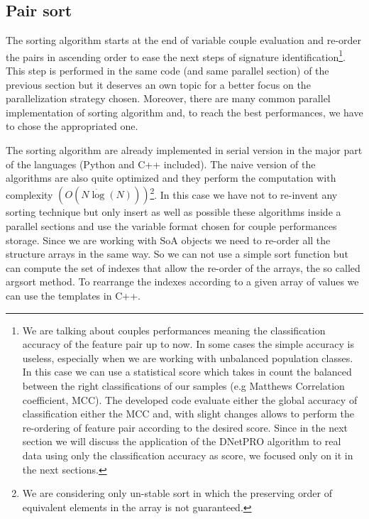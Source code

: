 \documentclass{standalone}
\begin{document}
\subsection[Sorting]{Pair sort}\label{implementation:sort}

The sorting algorithm starts at the end of variable couple evaluation and re-order the pairs in ascending order to ease the next steps of signature identification\footnote{
  We are talking about couples performances meaning the classification accuracy of the feature pair up to now.
  In some cases the simple accuracy is useless, especially when we are working with unbalanced population classes.
  In this case we can use a statistical score which takes in count the balanced between the right classifications of our samples (e.g Matthews Correlation coefficient, MCC).
  The developed code evaluate either the global accuracy of classification either the MCC and, with slight changes allows to perform the re-ordering of feature pair according to the desired score.
  Since in the next section we will discuss the application of the \textsf{DNetPRO} algorithm to real data using only the classification accuracy as score, we focused only on it in the next sections.
}.
This step is performed in the same code (and same parallel section) of the previous section but it deserves an own topic for a better focus on the parallelization strategy chosen.
Moreover, there are many common parallel implementation of sorting algorithm and, to reach the best performances, we have to chose the appropriated one.

The sorting algorithm are already implemented in serial version in the major part of the languages (\textsf{Python} and \textsf{C++} included).
The naive version of the algorithms are also quite optimized and they perform the computation with complexity $(O(N\dot\log(N)))$\footnote{
  We are considering only un-stable sort in which the preserving order of equivalent elements in the array is not guaranteed.
}.
In this case we have not to re-invent any sorting technique but only insert as well as possible these algorithms inside a parallel sections and use the variable format chosen for couple performances storage.
Since we are working with SoA objects we need to re-order all the structure arrays in the same way.
So we can not use a simple sort function but can compute the set of indexes that allow the re-order of the arrays, the so called \textsf{argsort} method.
To rearrange the indexes according to a given array of values we can use the templates in \textsf{C++}.
\end{document}
